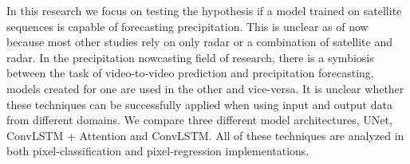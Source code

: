 In this research we focus on testing the hypothesis if a model trained on satellite sequences is capable of forecasting precipitation.
This is unclear as of now because most other studies rely on only radar or a combination of satellite and radar.
In the precipitation nowcasting field of research, there is a symbiosis between the task of video-to-video prediction and precipitation forecasting, models created for one are used in the other and vice-versa.
It is unclear whether these techniques can be successfully applied when using input and output data from different domains. We compare three different model architectures, UNet, ConvLSTM + Attention and ConvLSTM. All of these techniques are analyzed in both pixel-classification and pixel-regression implementations.